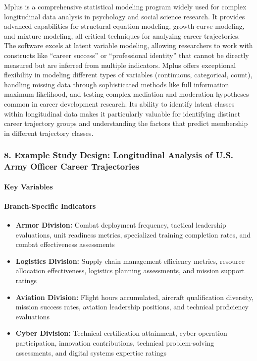 \documentclass[./main.tex]{subfiles}
\begin{document}
Mplus is a comprehensive statistical modeling program widely used for
complex longitudinal data analysis in psychology and social science
research. It provides advanced capabilities for structural equation
modeling, growth curve modeling, and mixture modeling, all critical
techniques for analyzing career trajectories. The software excels at
latent variable modeling, allowing researchers to work with constructs
like ``career success'' or ``professional identity'' that cannot be
directly measured but are inferred from multiple indicators. Mplus
offers exceptional flexibility in modeling different types of variables
(continuous, categorical, count), handling missing data through
sophisticated methods like full information maximum likelihood, and
testing complex mediation and moderation hypotheses common in career
development research. Its ability to identify latent classes within
longitudinal data makes it particularly valuable for identifying
distinct career trajectory groups and understanding the factors that
predict membership in different trajectory classes.

\subsubsection{8. Example Study Design: Longitudinal Analysis of U.S. Army
Officer Career
Trajectories}\label{example-study-design-longitudinal-analysis-of-u.s.-army-officer-career-trajectories}

\paragraph{Key Variables}\label{key-variables}

\paragraph{Branch-Specific Indicators}\label{branch-specific-indicators}

\begin{itemize}
\tightlist
\item
  \textbf{Armor Division:} Combat deployment frequency, tactical
  leadership evaluations, unit readiness metrics, specialized training
  completion rates, and combat effectiveness assessments
\item
  \textbf{Logistics Division:} Supply chain management efficiency
  metrics, resource allocation effectiveness, logistics planning
  assessments, and mission support ratings
\item
  \textbf{Aviation Division:} Flight hours accumulated, aircraft
  qualification diversity, mission success rates, aviation leadership
  positions, and technical proficiency evaluations
\item
  \textbf{Cyber Division:} Technical certification attainment, cyber
  operation participation, innovation contributions, technical
  problem-solving assessments, and digital systems expertise ratings
\end{itemize}
\end{document}
